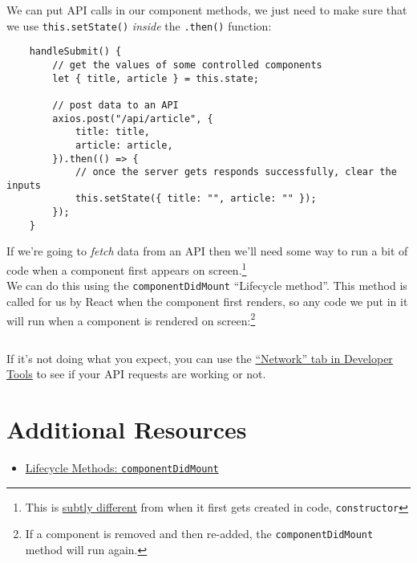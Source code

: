 We can put API calls in our component methods, we just need to make sure that we use \texttt{this.setState()} \textit{inside} the \texttt{.then()} function:

\begin{verbatim}
    handleSubmit() {
        // get the values of some controlled components
        let { title, article } = this.state;

        // post data to an API
        axios.post("/api/article", {
            title: title,
            article: article,
        }).then(() => {
            // once the server gets responds successfully, clear the inputs
            this.setState({ title: "", article: "" });
        });
    }
\end{verbatim}

If we're going to \textit{fetch} data from an API then we'll need some way to run a bit of code when a component first appears on screen.\footnote{This is \href{https://medium.com/@mahcloud/actions-in-the-constructor-or-componentdidmount-be3720e4a9a6}{subtly different} from when it first gets created in code, \texttt{constructor}}
\\

We can do this using the \texttt{componentDidMount} ``Lifecycle method''. This method is called for us by React when the component first renders, so any code we put in it will run when a component is rendered on screen:\footnote{If a component is removed and then re-added, the \texttt{componentDidMount} method will run again.}

\inputminted{js}{03-lifecycle-methods/figures/01-StarWarsFolks.jsx}

If it's not doing what you expect, you can use the \href{https://developer.mozilla.org/en-US/docs/Tools/Network_Monitor}{``Network'' tab in Developer Tools} to see if your API requests are working or not.



\section{Additional Resources}

\begin{itemize}[leftmargin=*]
    \item \href{https://reactjs.org/docs/react-component.html#componentdidmount}{Lifecycle Methods: \texttt{componentDidMount}}
\end{itemize}
